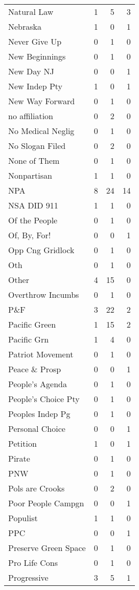 \begin{supertabular}{lrrr}
Natural Law & 1 & 5 & 3\\
Nebraska & 1 & 0 & 1\\
Never Give Up & 0 & 1 & 0\\
New Beginnings & 0 & 1 & 0\\
New Day NJ & 0 & 0 & 1\\
New Indep Pty & 1 & 0 & 1\\
New Way Forward & 0 & 1 & 0\\
no  affiliation & 0 & 2 & 0\\
No Medical Neglig & 0 & 1 & 0\\
No Slogan Filed & 0 & 2 & 0\\
None of Them & 0 & 1 & 0\\
Nonpartisan & 1 & 1 & 0\\
NPA & 8 & 24 & 14\\
NSA DID 911 & 1 & 1 & 0\\
Of the People & 0 & 1 & 0\\
Of, By, For! & 0 & 0 & 1\\
Opp Cng Gridlock & 0 & 1 & 0\\
Oth & 0 & 1 & 0\\
Other & 4 & 15 & 0\\
Overthrow Incumbs & 0 & 1 & 0\\
P\&F & 3 & 22 & 2\\
Pacific Green & 1 & 15 & 2\\
Pacific Grn & 1 & 4 & 0\\
Patriot Movement & 0 & 1 & 0\\
Peace \& Prosp & 0 & 0 & 1\\
People's Agenda & 0 & 1 & 0\\
People's Choice Pty & 0 & 1 & 0\\
Peoples Indep Pg & 0 & 1 & 0\\
Personal Choice & 0 & 0 & 1\\
Petition & 1 & 0 & 1\\
Pirate & 0 & 1 & 0\\
PNW & 0 & 1 & 0\\
Pols are Crooks & 0 & 2 & 0\\
Poor People Campgn & 0 & 0 & 1\\
Populist & 1 & 1 & 0\\
PPC & 0 & 0 & 1\\
Preserve Green Space & 0 & 1 & 0\\
Pro Life Cons & 0 & 1 & 0\\
Progressive & 3 & 5 & 1\\

\end{supertabular}

